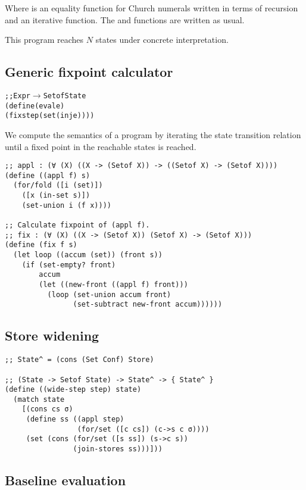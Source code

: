 \documentclass[preprint]{sigplanconf}
\begin{document}
Where  is an equality function for Church numerals
written in terms of recursion and an iterative  function.
The  and  functions are written as usual.

This program reaches $N$ states under concrete interpretation.

\newpage
\subsection{Generic fixpoint calculator}

\begin{alltt}
;; Expr \(\rightarrow\) Setof State
(define (eval e)
  (fix step (set (inj e))))
\end{alltt}

We compute the semantics of a program by iterating the state
transition relation until a fixed point in the reachable states is
reached.

\begin{verbatim}
;; appl : (∀ (X) ((X -> (Setof X)) -> ((Setof X) -> (Setof X))))
(define ((appl f) s)
  (for/fold ([i (set)])
    ([x (in-set s)])
    (set-union i (f x))))

;; Calculate fixpoint of (appl f).
;; fix : (∀ (X) ((X -> (Setof X)) (Setof X) -> (Setof X)))
(define (fix f s)
  (let loop ((accum (set)) (front s))
    (if (set-empty? front)
        accum
        (let ((new-front ((appl f) front)))
          (loop (set-union accum front)
                (set-subtract new-front accum))))))
\end{verbatim}

\subsection{Store widening}

\begin{verbatim}
;; State^ = (cons (Set Conf) Store)

;; (State -> Setof State) -> State^ -> { State^ }
(define ((wide-step step) state)
  (match state
    [(cons cs σ)
     (define ss ((appl step)
                 (for/set ([c cs]) (c->s c σ))))
     (set (cons (for/set ([s ss]) (s->c s))
                (join-stores ss)))]))
\end{verbatim}

\subsection{Baseline evaluation}
\end{document}
